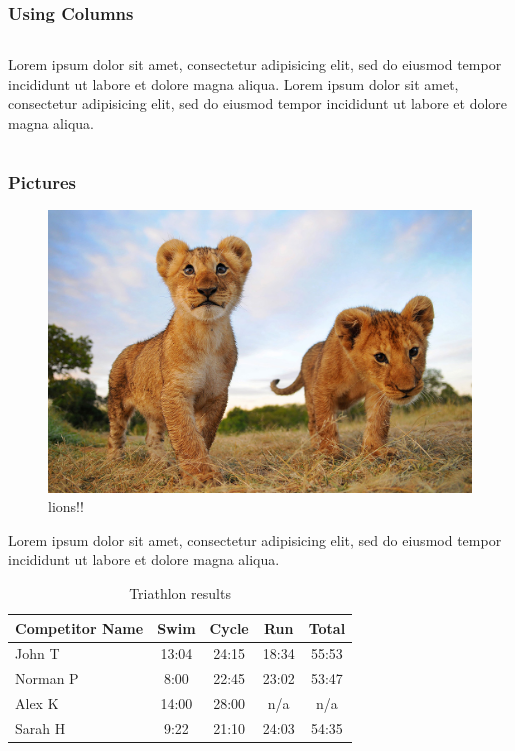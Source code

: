 \documentclass[14pt]{beamer}
\begin{document}
\begin{frame}
\frametitle{Using Columns}
\begin{columns}
	Lorem ipsum dolor sit amet, consectetur adipisicing elit, sed do eiusmod tempor incididunt ut labore et dolore magna aliqua.
	Lorem ipsum dolor sit amet, consectetur adipisicing elit, sed do eiusmod tempor incididunt ut labore et dolore magna aliqua.
\end{columns}
\end{frame}

\begin{frame}
\frametitle{Pictures}
\begin{figure}
	\includegraphics[width=\textwidth]{Lion}
	\caption{lions!!}
\end{figure}
	Lorem ipsum dolor sit amet, consectetur adipisicing elit, sed do eiusmod tempor incididunt ut labore et dolore magna aliqua.
\end{frame}

\begin{frame}
\begin{table}
	\begin{tabular}{l | c | c | c | c }
		Competitor Name & Swim & Cycle & Run & Total \\
		\hline \hline
		John T & 13:04 & 24:15 & 18:34 & 55:53 \\
		Norman P & 8:00 & 22:45 & 23:02 & 53:47\\
		Alex K & 14:00 & 28:00 & n/a & n/a\\
		Sarah H & 9:22 & 21:10 & 24:03 & 54:35
	\end{tabular}
	\caption{Triathlon results}
\end{table}
\end{frame}
\end{document}
